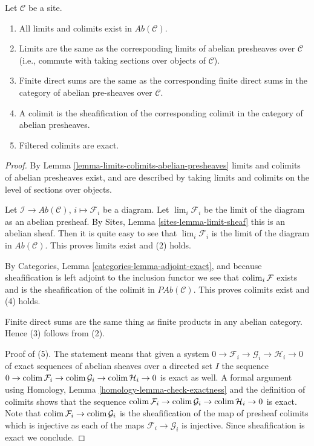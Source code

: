 \begin{lemma}
\label{lemma-limits-colimits-abelian-sheaves}
Let $\mathcal{C}$ be a site.
\begin{enumerate}
\item All limits and colimits exist in $\textit{Ab}(\mathcal{C})$.
\item Limits are the same as the corresponding limits of abelian presheaves
over $\mathcal{C}$ (i.e., commute with taking sections over objects of
$\mathcal{C}$).
\item Finite direct sums are the same as the corresponding finite direct sums
in the category of abelian pre-sheaves over $\mathcal{C}$.
\item A colimit is the sheafification of the corresponding colimit in
the category of abelian presheaves.
\item Filtered colimits are exact.
\end{enumerate}
\end{lemma}

\begin{proof}
By Lemma \ref{lemma-limits-colimits-abelian-presheaves} limits and colimits
of abelian presheaves exist, and are described by taking limits and colimits
on the level of sections over objects.

\medskip\noindent
Let $\mathcal{I} \to \textit{Ab}(\mathcal{C})$, $i \mapsto \mathcal{F}_i$
be a diagram. Let $\lim_i \mathcal{F}_i$ be the limit of the diagram
as an abelian presheaf. By Sites, Lemma \ref{sites-lemma-limit-sheaf}
this is an abelian sheaf. Then it is quite easy to see that
$\lim_i \mathcal{F}_i$ is the limit of the diagram in
$\textit{Ab}(\mathcal{C})$. This proves limits exist and (2) holds.

\medskip\noindent
By Categories, Lemma \ref{categories-lemma-adjoint-exact}, and because
sheafification is left adjoint to the inclusion functor we see that
$\mathop{\mathrm{colim}}\nolimits_i \mathcal{F}$ exists and is the sheafification of the colimit
in $\textit{PAb}(\mathcal{C})$. This proves colimits exist and (4) holds.

\medskip\noindent
Finite direct sums are the same thing as finite products in any abelian
category. Hence (3) follows from (2).

\medskip\noindent
Proof of (5). The statement means that given a system
$0 \to \mathcal{F}_i \to \mathcal{G}_i \to \mathcal{H}_i \to 0$
of exact sequences of abelian sheaves over a directed set $I$ the sequence
$0 \to \mathop{\mathrm{colim}}\nolimits \mathcal{F}_i \to \mathop{\mathrm{colim}}\nolimits \mathcal{G}_i \to
\mathop{\mathrm{colim}}\nolimits \mathcal{H}_i \to 0$ is exact as well. A formal argument using
Homology, Lemma \ref{homology-lemma-check-exactness} and the
definition of colimits shows that the sequence
$\mathop{\mathrm{colim}}\nolimits \mathcal{F}_i \to \mathop{\mathrm{colim}}\nolimits \mathcal{G}_i \to \mathop{\mathrm{colim}}\nolimits \mathcal{H}_i \to 0$
is exact. Note that $\mathop{\mathrm{colim}}\nolimits \mathcal{F}_i \to \mathop{\mathrm{colim}}\nolimits \mathcal{G}_i$
is the sheafification of the map of presheaf colimits which is
injective as each of the maps $\mathcal{F}_i \to \mathcal{G}_i$ is
injective. Since sheafification is exact we conclude.
\end{proof}







